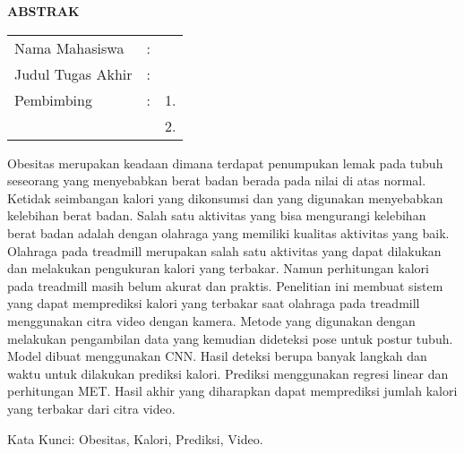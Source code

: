 \begin{center}
  \large\textbf{ABSTRAK}
\end{center}


\vspace{2ex}

\begingroup
\setlength{\tabcolsep}{0pt}

\noindent
\begin{tabularx}{\textwidth}{l >{\centering}m{2em} X}
  Nama Mahasiswa    & : & \name{}         \\

  Judul Tugas Akhir & : & \tatitle{}      \\

  Pembimbing        & : & 1. \advisor{}   \\
                    &   & 2. \coadvisor{} \\
\end{tabularx}
\endgroup

Obesitas merupakan keadaan dimana terdapat penumpukan lemak pada tubuh seseorang yang menyebabkan berat badan berada pada nilai di atas normal. Ketidak seimbangan kalori yang dikonsumsi dan yang digunakan menyebabkan kelebihan berat badan. Salah satu aktivitas yang bisa mengurangi kelebihan berat badan adalah dengan olahraga yang memiliki kualitas aktivitas yang baik. Olahraga pada treadmill merupakan salah satu aktivitas yang dapat dilakukan dan melakukan pengukuran kalori yang terbakar. Namun perhitungan kalori pada treadmill masih belum akurat dan praktis. Penelitian ini membuat sistem yang dapat memprediksi kalori yang terbakar saat olahraga pada treadmill menggunakan citra video dengan kamera. Metode yang digunakan dengan melakukan pengambilan data yang kemudian dideteksi pose untuk postur tubuh. Model dibuat menggunakan CNN. Hasil deteksi berupa banyak langkah dan waktu untuk dilakukan prediksi kalori. Prediksi menggunakan regresi linear dan perhitungan MET. Hasil akhir yang diharapkan dapat memprediksi jumlah kalori yang terbakar dari citra video.

Kata Kunci: Obesitas, Kalori, Prediksi, Video.

